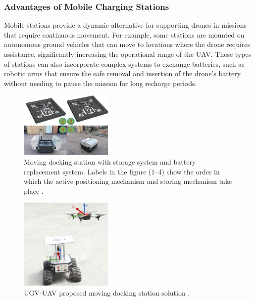 \subsubsection{Advantages of Mobile Charging Stations}
    Mobile stations provide a dynamic alternative for supporting drones in missions that require continuous movement. For example, some stations are mounted on autonomous ground vehicles that can move to locations where the drone requires assistance, significantly increasing the operational range of the UAV. These types of stations can also incorporate complex systems to exchange batteries, such as robotic arms that ensure the safe removal and insertion of the drone's battery without needing to pause the mission for long recharge periods.
    
    \begin{figure}[H]
        \centering
        \includegraphics[width=0.4\textwidth]{pictures/mobile_1.png}
        \caption{Moving docking station with storage system and battery replacement system. Labels in the figure (1–4) show the order in which the active positioning mechanism and storing mechanism take place \cite{grlj_docking_stations}.}
        \label{fig:mobile_charging1}
    \end{figure}

    \begin{figure}[H]
        \centering
        \includegraphics[width=0.4\textwidth]{pictures/mobile_2.png}
        \caption{UGV-UAV proposed moving docking station solution \cite{grlj_docking_stations}.}
        \label{fig:mobile_charging2}
    \end{figure}

